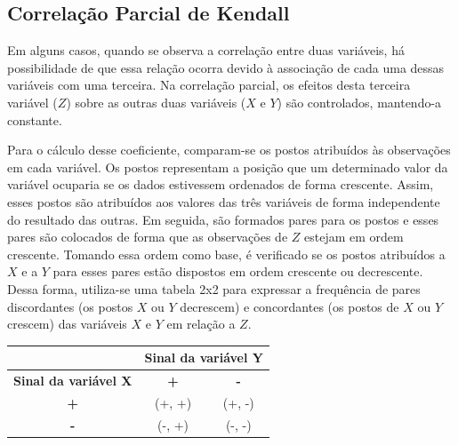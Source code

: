 \documentclass[
]{estat/estat}
\begin{document}
\subsection{Correlação Parcial de
Kendall}\label{correlauxe7uxe3o-parcial-de-kendall}

Em alguns casos, quando se observa a correlação entre duas variáveis, há
possibilidade de que essa relação ocorra devido à associação de cada uma
dessas variáveis com uma terceira. Na correlação parcial, os efeitos
desta terceira variável (\(Z\)) sobre as outras duas variáveis (\(X\) e
\(Y\)) são controlados, mantendo-a constante.

Para o cálculo desse coeficiente, comparam-se os postos atribuídos às
observações em cada variável. Os postos representam a posição que um
determinado valor da variável ocuparia se os dados estivessem ordenados
de forma crescente. Assim, esses postos são atribuídos aos valores das
três variáveis de forma independente do resultado das outras. Em
seguida, são formados pares para os postos e esses pares são colocados
de forma que as observações de \(Z\) estejam em ordem crescente. Tomando
essa ordem como base, é verificado se os postos atribuídos a \(X\) e a
\(Y\) para esses pares estão dispostos em ordem crescente ou
decrescente. Dessa forma, utiliza-se uma tabela 2x2 para expressar a
frequência de pares discordantes (os postos \(X\) ou \(Y\) decrescem) e
concordantes (os postos de \(X\) ou \(Y\) crescem) das variáveis \(X\) e
\(Y\) em relação a \(Z\).

\begin{table}[H]
\centering
\begin{tabular}{c|cc}
\multicolumn{1}{l|}{}        & \multicolumn{2}{c}{\textbf{Sinal da variável Y}} \\ \midrule
\textbf{Sinal da variável X} & \textbf{+}              & \textbf{-}             \\ \midrule
\textbf{+}                   & (+, +)                  & (+, -)                 \\
\textbf{-}                   & (-, +)                  & (-, -)     
\end{tabular}
\end{table}

\end{document}
